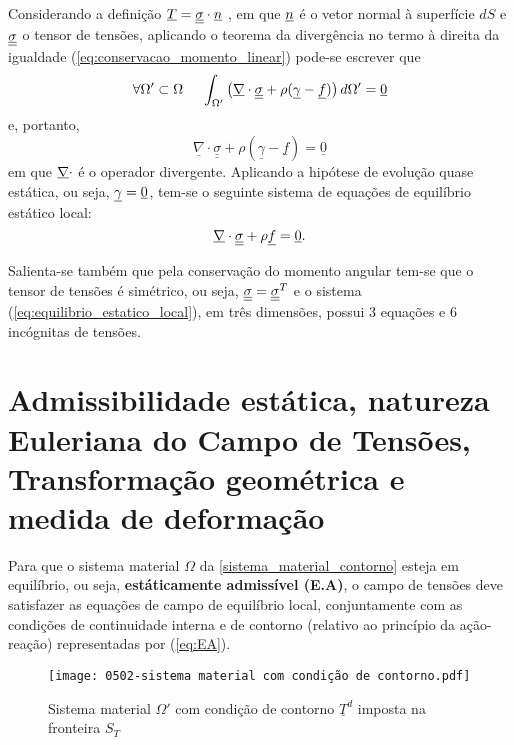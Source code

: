 Considerando a definição $\underline T = \underline{\underline \sigma} \cdot \underline n$ , em que $\underline n$ é o vetor normal à superfície $dS$ e $\underline{\underline \sigma}$ o tensor de tensões, aplicando o teorema da divergência no termo à direita da igualdade (\ref{eq:conservacao_momento_linear}) pode-se escrever que
\begin{equation}
	\label{teorema_divergencia}
	\forall \Omega' \subset \Omega ~~~~ \int_{\Omega'}\left( \underline \nabla \cdot \underline{\underline \sigma}+ \rho(\underline \gamma-\underline f) \right)d\Omega' = \underline 0
\end{equation}
e, portanto,
\begin{equation}
	\label{eq:resultado_teorema_divergencia}
	 \underline \nabla \cdot \underline{\underline\sigma}+ \rho(\underline\gamma-\underline f) = \underline 0
\end{equation}
em que $\underline \nabla \cdot$ é o operador divergente. Aplicando a hipótese de evolução quase estática, ou seja, $\underline \gamma = \underline 0$, tem-se o seguinte sistema de equações de equilíbrio estático local:
\begin{equation}
	\label{eq:equilibrio_estatico_local}
	\underline \nabla \cdot \underline{\underline \sigma}+ \rho \underline f = \underline 0.
\end{equation}

Salienta-se também que pela conservação do momento angular tem-se que o tensor de tensões é simétrico, ou seja, $\underline{\underline \sigma} = \underline{\underline \sigma}^T$ e o sistema (\ref{eq:equilibrio_estatico_local}), em três dimensões, possui 3 equações e 6 incógnitas de tensões.

\section{Admissibilidade estática, natureza Euleriana do Campo de Tensões, Transformação geométrica e medida de deformação}

Para que o sistema material $\Omega$ da \autoref{sistema_material_contorno} esteja em equilíbrio, ou seja, \textbf{estáticamente admissível (E.A)}, o campo de tensões deve satisfazer as equações de campo de equilíbrio local, conjuntamente com as condições de continuidade interna e de contorno (relativo ao princípio da ação-reação) representadas por (\ref{eq:EA}).

\begin{figure}[H]
	\begin{center}
		\texttt{[image: 0502-sistema material com condição de contorno.pdf]}
	\end{center}
	\caption{\label{sistema_material_contorno}Sistema material $\Omega'$ com condição de contorno $\underline T^d$ imposta na fronteira $S_T$}
\end{figure}

